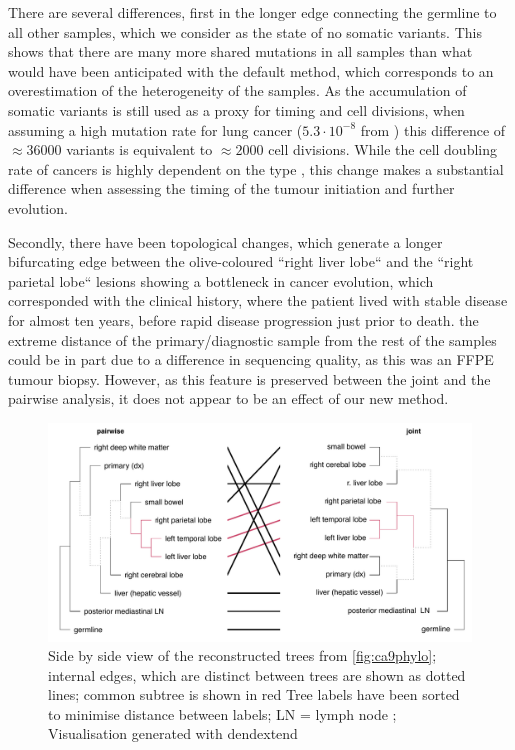There are several  differences, first in the longer edge connecting the germline to all other samples, which we consider as the state of no somatic variants. This shows that there are many more shared mutations in all samples than what would have been anticipated with the default method, which corresponds to an overestimation of the heterogeneity of the samples. As the accumulation of somatic variants is still used as a proxy for timing and cell divisions, when assuming a high mutation rate for lung cancer ($5.3 \cdot 10^{-8}$ from \citeauthor*{Werner2020} \cite{Werner2020}) this difference of $\approx 36000$ variants is equivalent to $\approx 2000$ cell divisions. While the cell doubling rate of cancers is highly dependent on the type \cite{Arai1994}, this change makes a substantial difference when assessing the timing of the tumour initiation and further evolution. 

Secondly, there have been topological changes, which generate a longer bifurcating edge between the olive-coloured ``right liver lobe`` and the ``right parietal lobe`` lesions showing a bottleneck in cancer evolution, which corresponded with the clinical history, where the patient lived with stable disease for almost ten years, before rapid disease progression just prior to death.  the extreme distance of the primary/diagnostic sample from the rest of the samples could be in part due to a difference in sequencing quality, as this was an FFPE tumour biopsy. However, as this feature is preserved between the joint and the pairwise analysis, it does not appear to be an effect of our new method.

\begin{figure}[ht]
\centering
\includegraphics[width=.99\linewidth]{Figures/jointVariantCalling/tanglePhyloCA9.pdf}
\caption[Tanglegram of the reconstructed phylogenies]{Side by side view of the reconstructed trees from \autoref{fig:ca9phylo}; internal edges, which are distinct between trees are shown as dotted lines; common subtree is shown in red  Tree labels have been sorted to minimise distance between labels; LN = lymph node ; Visualisation generated with dendextend \cite{Galili2015}}\label{fig:tanglePhyloCA9}
\end{figure}

